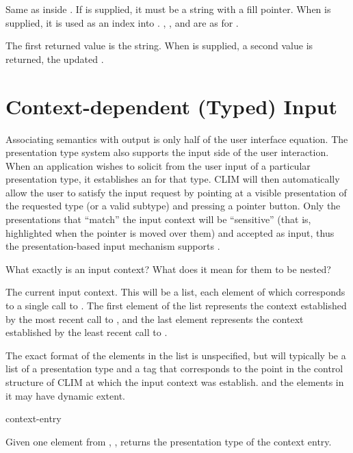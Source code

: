 Same as  inside .  If  is
supplied, it must be a string with a fill pointer.  When  is
supplied, it is used as an index into .  ,
, and  are as for .

The first returned value is the string.  When  is supplied, a second
value is returned, the updated .


\section {Context-dependent (Typed) Input}

Associating semantics with output is only half of the user interface equation.
The presentation type system also supports the input side of the user
interaction.  When an application wishes to solicit from the user input of a
particular presentation type, it establishes an  for that
type.  CLIM will then automatically allow the user to satisfy the input request
by pointing at a visible presentation of the requested type (or a valid subtype)
and pressing a pointer button.  Only the presentations that ``match'' the input
context will be ``sensitive'' (that is, highlighted when the pointer is moved
over them) and accepted as input, thus the presentation-based input mechanism
supports .

 {What exactly is an input context?  What does it mean for them to
be nested?}


The current input context.  This will be a list, each element of which
corresponds to a single call to .  The first element of
the list represents the context established by the most recent call to
, and the last element represents the context established
by the least recent call to .

The exact format of the elements in the list is unspecified, but will typically
be a list of a presentation type and a tag that corresponds to the point in the
control structure of CLIM at which the input context was establish.
 and the elements in it may have dynamic extent.

 {context-entry}

Given one element from , , returns the
presentation type of the context entry.

